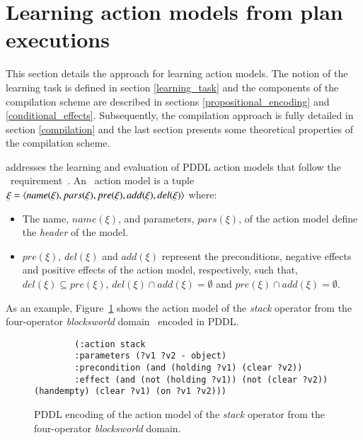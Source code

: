 
\section{Learning action models from plan executions}
\label{sec:learning}

This section details the \FAMA approach for learning action models. The notion of the learning task is defined in section \ref{learning_task} and the components of the compilation scheme are described in sections \ref{propositional_encoding} and \ref{conditional_effects}. Subsequently, the compilation approach is fully detailed in section \ref{compilation} and the last section presents some theoretical properties of the compilation scheme.

\FAMA addresses the learning and evaluation of PDDL action models that follow the \strips\ requirement~\cite{mcdermott1998pddl,fox2003pddl2}. An \strips\ action model is a tuple $\xi={\langle name(\xi),pars(\xi),pre(\xi),add(\xi),del(\xi) \rangle}$ where:

\begin{itemize}
	\item The name, $name(\xi)$, and parameters, $pars(\xi)$, of the action model define the {\em header} of the model.
	\item $pre(\xi)$, $del(\xi)$ and $add(\xi)$ represent the preconditions, negative effects and positive effects of the action model, respectively, such that, $del(\xi)\subseteq pre(\xi)$, $del(\xi)\cap add(\xi)=\emptyset$ and $pre(\xi)\cap add(\xi)=\emptyset$.
\end{itemize}


As an example, Figure~\ref{fig:stack} shows the action model of the {\em stack} operator from the four-operator {\em blocksworld} domain~\cite{slaney2001blocks} encoded in PDDL.

\begin{figure}[hbt!]
	\begin{footnotesize}
		\begin{verbatim}
		(:action stack
		:parameters (?v1 ?v2 - object)
		:precondition (and (holding ?v1) (clear ?v2))
		:effect (and (not (holding ?v1)) (not (clear ?v2)) (handempty) (clear ?v1) (on ?v1 ?v2)))
		\end{verbatim}
	\end{footnotesize}
	\caption{PDDL encoding of the action model of the {\em stack} operator from the four-operator {\em blocksworld} domain.}
	\label{fig:stack}
\end{figure}



